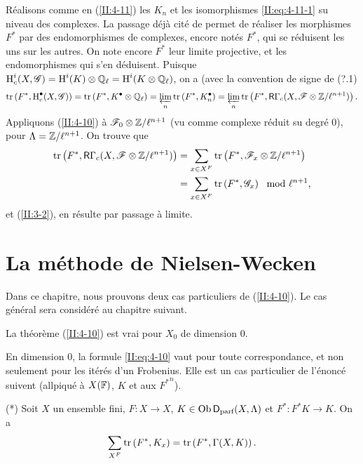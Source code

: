 \documentclass[oneside]{book}
\begin{document}
R\'ealisons comme en (\ref{II:4-11}) les $K_n$ et les isomorphismes 
\eqref{II:eq:4-11-1} su niveau des complexes. La passage d\'ej\`a cit\'e de 
\cite[XV.3.3]{SGA5} permet de r\'ealiser les morphismes $F^*$ par des 
endomorphismes de complexes, encore not\'es $F^*$, qui se r\'eduisent les uns 
sur les autres. On note encore $F^*$ leur limite projective, et les 
endomorphismes qui s'en d\'eduisent. Puisque 
$\operatorname{H}_c^i(X,\mathscr{G}) = \operatorname{H}^i(K)\otimes\mathbb{Q}_\ell = \operatorname{H}^i(K\otimes\mathbb{Q}_\ell)$, on a (avec 
la convention de signe de (?.1) 
\[
  \operatorname{tr}\left(F^*, \operatorname{H}_c^\bullet(X,\mathscr{G})\right) = \operatorname{tr}\left(F^*,K^\bullet\otimes\mathbb{Q}_\ell\right) = \varprojlim_n \operatorname{tr}\left(F^*,K_n^\bullet\right) = \varprojlim_n \operatorname{tr}\left(F^*,\mathsf{R}\Gamma_c(X,\mathscr{F}\otimes\mathbb{Z}/\ell^{n+1})\right) \text{.}
\]
Appliquons (\ref{II:4-10}) \`a $\mathscr{F}_0\otimes\mathbb{Z}/\ell^{n+1}$ (vu comme complexe 
r\'eduit su degr\'e $0$), pour $\Lambda=\mathbb{Z}/\ell^{n+1}$. On trouve que 
\begin{align*}
  \operatorname{tr}\left(F^*,\mathsf{R}\Gamma_c(X,\mathscr{F}\otimes\mathbb{Z}/\ell^{n+1})\right) 
    &= \sum_{x\in X^F} \operatorname{tr}\left(F^*,\mathscr{F}_x\otimes\mathbb{Z}/\ell^{n+1}\right) \\
    &= \sum_{x\in X^F} \operatorname{tr}\left(F^*,\mathscr{G}_x\right) \mod \ell^{n+1} \text{,}
\end{align*}
et (\ref{II:3-2}), en r\'esulte par passage \`a limite. 










\section{La m\'ethode de Nielsen-Wecken}\label{II:5}

Dans ce chapitre, nous prouvons deux cas particuliers de (\ref{II:4-10}). Le 
cas g\'en\'eral sera consid\'er\'e au chapitre suivant. 





\begin{lemma_}\label{II:5-1}
La th\'eor\`eme (\ref{II:4-10}) est vrai pour $X_0$ de dimension $0$. 
\end{lemma_}

En dimension $0$, la formule \eqref{II:eq:4-10} vaut pour toute 
correspondance, et non seulement pour les it\'er\'es d'un Frobenius. Elle est 
un cas particulier de l'\'enonc\'e suivent (allpiqu\'e \`a $X(\mathbb{F})$, $K$ et 
aux ${F^*}^n$). 

(*) Soit $X$ un ensemble fini, $F:X\to X$, $K\in\operatorname{Ob}\mathsf{D}_\text{parf}(X,\Lambda)$ 
et $F^*:F^* K\to K$. On a 
\[
  \sum_{X^F} \operatorname{tr}\left(F^*,K_x\right) = \operatorname{tr}\left(F^*,\Gamma(X,K)\right) \text{.}
\]
\end{document}
